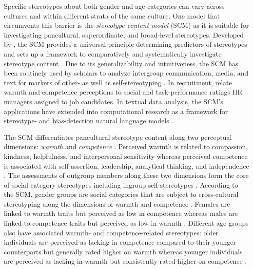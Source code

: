 \documentclass[man]{apa7}
\begin{document}
Specific stereotypes about both gender and age categories can vary across cultures and within different strata of the same culture. One model that circumvents this barrier is the \textit{stereotype content model} (SCM) as it is suitable for investigating pancultural, superordinate, and broad-level stereotypes. Developed by \Textcite{fiske_model_2002}, the SCM provides a universal principle determining predictors of stereotypes and sets up a framework to comparatively and systematically investigate stereotype content \parencite{kroon_reliable_2018, van_selm_search_2021}. Due to its generalizability and intuitiveness, the SCM has been routinely used by scholars to analyze intergroup communication, media, and text for markers of other- as well as self-stereotyping \parencite{westerhof_filling_2010, white_think_2009}. In recruitment, \Textcite{hofhuis_dealing_2016} relate warmth and competence perceptions to social and task-performance ratings HR managers assigned to job candidates. In textual data analysis, the SCM’s applications have extended into computational research as a framework for stereotype- and bias-detection natural language models \parencite{nicolas2020ComprehensiveStereotypeContent}.

The SCM differentiates pancultural stereotype content along two perceptual dimensions: \textit{warmth} and \textit{competence} \parencite{cuddy_stereotype_2009}. Perceived warmth is related to compassion, kindness, helpfulness, and interpersonal sensitivity whereas perceived competence is associated with self-assertion, leadership, analytical thinking, and independence \parencite[]{bruckmuller_density_2013, Carli2016, hummert_multiple_1990}. The assessments of outgroup members along these two dimensions form the core of social category stereotypes including ingroup self-stereotypes \parencite{hinton_exploring_2019}. According to the SCM, gender groups are social categories that are subject to cross-cultural stereotyping along the dimensions of warmth and competence \parencite{fiske_model_2002}. Females are linked to warmth traits but perceived as low in competence whereas males are linked to competence traits but perceived as low in warmth \parencite{Eagly1997, suh_gender_2004}. Different age groups also have associated warmth- and competence-related stereotypes: older individuals are perceived as lacking in competence compared to their younger counterparts but generally rated higher on warmth whereas younger individuals are perceived as lacking in warmth but consistently rated higher on competence \parencite{cuddy_this_2005, van_selm_search_2021}.
\end{document}

